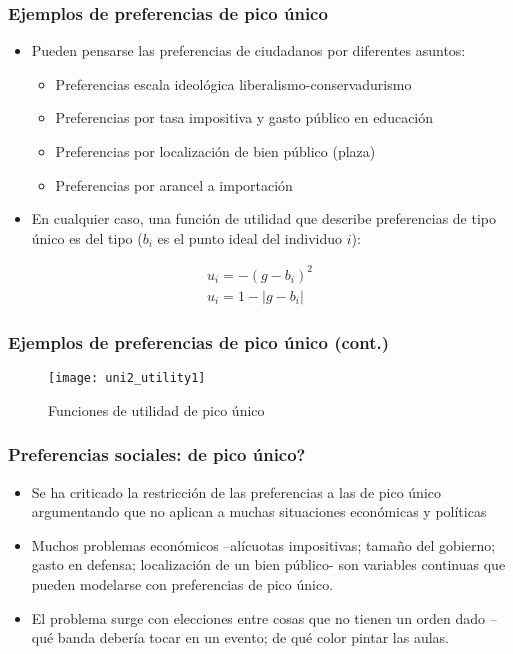 \documentclass[14pt,aspectratio=169]{beamer}
\begin{document}
\begin{frame}\frametitle{Ejemplos de preferencias de pico único}
\begin{itemize}\itemsep 10pt
\item Pueden pensarse las preferencias de ciudadanos por diferentes
  asuntos:
\begin{itemize}\itemsep 5pt \medskip
\item Preferencias escala ideológica liberalismo-conservadurismo
\item Preferencias por tasa impositiva y gasto público en educación
\item Preferencias por localización de bien público (plaza)
\item Preferencias por arancel a importación
\end{itemize}
\item En cualquier caso, una función de utilidad que describe
  preferencias de tipo único es del tipo ($b_i$ es el punto ideal del
  individuo $i$):
\end{itemize}
\begin{align*}
u_i=-(g-b_i)^2  \\
u_i=1-\lvert g-b_i \rvert
\end{align*}
\end{frame}


\begin{frame}\frametitle{Ejemplos de preferencias de pico único (cont.)}
 \begin{figure}[htbp]
    \centering
    \texttt{[image: uni2\_utility1]}
    \caption{Funciones de utilidad de pico único}
    \label{fig:1}
  \end{figure}
\end{frame}


\begin{frame}\frametitle{Preferencias sociales: de pico
    único?}
\begin{itemize}\itemsep 15pt
\item Se ha criticado la restricción de las preferencias a las de pico
  único argumentando que no aplican a muchas situaciones
  económicas y políticas
\item Muchos problemas económicos   --alícuotas impositivas; tamaño del gobierno; gasto en defensa;
  localización de un bien público- son variables continuas que pueden
  modelarse con preferencias de pico único.
\item El problema surge con elecciones entre cosas
  que no tienen un orden dado --qué banda debería tocar en un evento;
  de qué color pintar las aulas. 
\end{itemize}
\end{frame}
\end{document}
